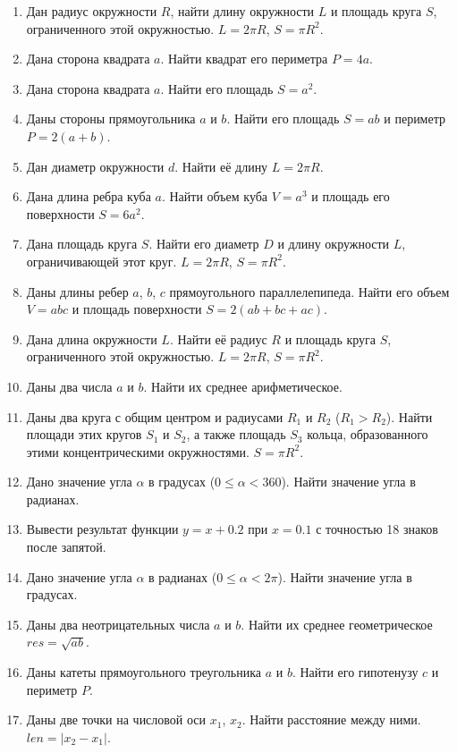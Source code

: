 \documentclass[main.tex]{subfiles}
\begin{document}
% 
\begin{enumerate}
    \item Дан радиус окружности $R$, найти длину окружности $L$ и площадь круга $S$, ограниченного этой окружностью. $L = 2 \pi R$, $S = \pi R^2$.
    \item Дана сторона квадрата $a$. Найти квадрат его периметра $P = 4a$.
    \item Дана сторона квадрата $a$. Найти его площадь $S = a^2$.
    \item Даны стороны прямоугольника $a$ и $b$. Найти его площадь $S = a b$ и периметр $P = 2 (a + b)$.
    \item Дан диаметр окружности $d$. Найти её длину $L = 2 \pi R$.
    \item Дана длина ребра куба $a$. Найти объем куба $V = a^3$ и площадь его поверхности $S = 6 a^2$.
    \item Дана площадь круга $S$. Найти его диаметр $D$ и длину окружности $L$, ограничивающей этот круг. $L = 2 \pi R$, $S = \pi R^2$.
    \item Даны длины ребер $a$, $b$, $c$ прямоугольного параллелепипеда. Найти
    его объем $V = a b c$ и площадь поверхности $S = 2 (a b + b c + a c)$.
    \item Дана длина окружности $L$. Найти её радиус $R$ и площадь круга $S$, ограниченного этой окружностью. $L = 2 \pi R$, $S = \pi R^2$.
    \item Даны два числа $a$ и $b$. Найти их среднее арифметическое.
    \item Даны два круга с общим центром и радиусами $R_1$ и $R_2$ ($R_1 > R_2$). Найти площади этих кругов $S_1$ и $S_2$, а также площадь $S_3$ кольца, образованного этими концентрическими окружностями. $S = \pi R^2$.
    \item Дано значение угла $\alpha$ в градусах ($0 \leq \alpha < 360$). Найти значение угла в радианах.
    \item Вывести результат функции $y = x + 0.2$ при $x = 0.1$ с точностью 18 знаков после запятой.
    \item Дано значение угла $\alpha$ в радианах ($0 \leq \alpha < 2 \pi$). Найти значение угла в градусах.
    \item Даны два неотрицательных числа $a$ и $b$. Найти их среднее геометрическое $res = \sqrt{a b}$.
    \item Даны катеты прямоугольного треугольника $a$ и $b$. Найти его гипотенузу $c$ и периметр $P$.
    \item Даны две точки на числовой оси $x_1$, $x_2$. Найти расстояние между ними. $len = |x_2 - x_1|$.

\end{enumerate}
\end{document}

